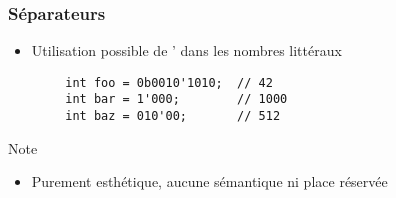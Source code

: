 \documentclass[C++.tex]{subfiles}
\begin{document}
\begin{frame}[fragile]
	\frametitle{Séparateurs}
	\begin{itemize}
		\item Utilisation possible de ' dans les nombres littéraux
	\end{itemize}

	\begin{verbatim}
		int foo = 0b0010'1010;  // 42
		int bar = 1'000;        // 1000
		int baz = 010'00;       // 512
	\end{verbatim}

	\begin{block}{Note}
		\begin{itemize}
			\item Purement esthétique, aucune sémantique ni place réservée
		\end{itemize}
	\end{block}


\end{frame}
\end{document}
